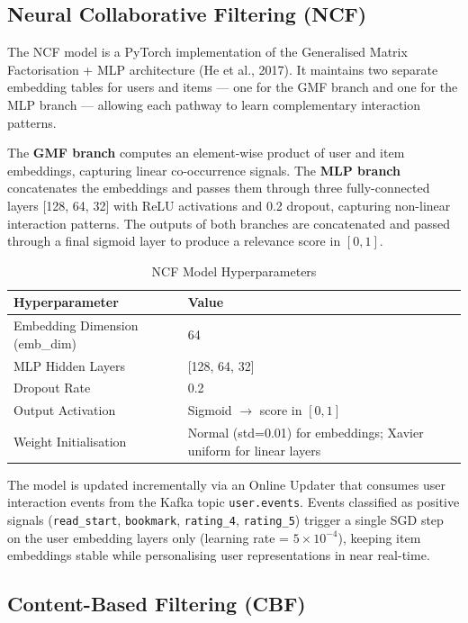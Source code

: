 \subsection{Neural Collaborative Filtering (NCF)}

The NCF model is a PyTorch implementation of the Generalised Matrix
Factorisation + MLP architecture (He et al., 2017). It maintains two separate
embedding tables for users and items --- one for the GMF branch and one for
the MLP branch --- allowing each pathway to learn complementary interaction
patterns.

The \textbf{GMF branch} computes an element-wise product of user and item
embeddings, capturing linear co-occurrence signals. The \textbf{MLP branch}
concatenates the embeddings and passes them through three fully-connected
layers [128, 64, 32] with ReLU activations and 0.2 dropout, capturing
non-linear interaction patterns. The outputs of both branches are concatenated
and passed through a final sigmoid layer to produce a relevance score in
$[0,1]$.

\begin{table}[H]
\centering
\caption{NCF Model Hyperparameters}
\label{tab:ncf}
\begin{tabularx}{\textwidth}{|l|X|}
\hline
\textbf{Hyperparameter} & \textbf{Value} \\
\hline
Embedding Dimension (emb\_dim) & 64 \\
\hline
MLP Hidden Layers & [128, 64, 32] \\
\hline
Dropout Rate & 0.2 \\
\hline
Output Activation & Sigmoid $\rightarrow$ score in $[0, 1]$ \\
\hline
Weight Initialisation & Normal (std=0.01) for embeddings; Xavier uniform for linear layers \\
\hline
\end{tabularx}
\end{table}

The model is updated incrementally via an Online Updater that consumes user
interaction events from the Kafka topic \texttt{user.events}. Events classified
as positive signals (\texttt{read\_start}, \texttt{bookmark},
\texttt{rating\_4}, \texttt{rating\_5}) trigger a single SGD step on the user
embedding layers only (learning rate = $5 \times 10^{-4}$), keeping item
embeddings stable while personalising user representations in near real-time.

\subsection{Content-Based Filtering (CBF)}

